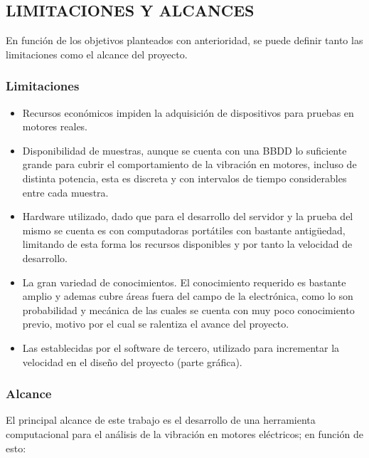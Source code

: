
\subsection{LIMITACIONES Y ALCANCES}
	En función de los objetivos planteados con anterioridad, se puede definir tanto las limitaciones como el alcance del proyecto.

\subsubsection{Limitaciones}
\begin{itemize}
	\item Recursos económicos impiden la adquisición de dispositivos para pruebas en motores reales.

	\item Disponibilidad de muestras, aunque se cuenta con una BBDD lo suficiente grande para cubrir el comportamiento de la vibración en motores, incluso de distinta potencia, esta es discreta y con intervalos de tiempo considerables entre cada muestra.

	\item Hardware utilizado, dado que para el desarrollo del servidor y la prueba del mismo se cuenta es con computadoras portátiles con bastante antigüedad, limitando de esta forma los recursos disponibles y por tanto la velocidad de desarrollo.

	\item La gran variedad de conocimientos. El conocimiento requerido es bastante amplio y ademas cubre áreas fuera del campo de la electrónica, como lo son probabilidad y mecánica de las cuales se cuenta con muy poco conocimiento previo, motivo por el cual se ralentiza el avance del proyecto.

	\item Las establecidas por el software de tercero, utilizado para incrementar la velocidad en el diseño del proyecto (parte gráfica).
\end{itemize}

\subsubsection{Alcance}
	El principal alcance de este trabajo es el desarrollo de una herramienta computacional para el análisis de la vibración en motores eléctricos; en función de esto:

